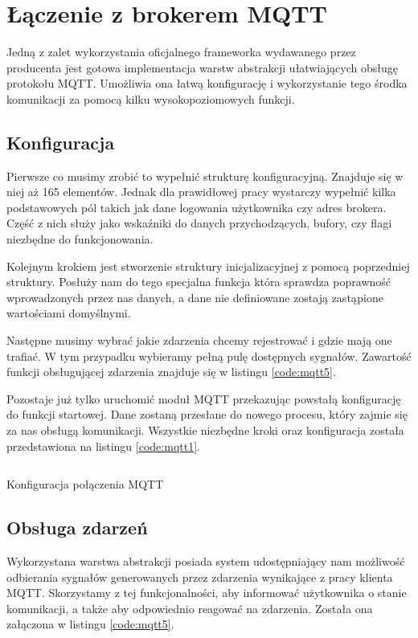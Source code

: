     \section{Łączenie z brokerem MQTT}
        Jedną z zalet wykorzystania oficjalnego frameworka wydawanego przez producenta jest gotowa implementacja warstw abstrakcji ułatwiających obsługę protokołu MQTT. Umożliwia ona łatwą konfigurację i wykorzystanie tego środka komunikacji za pomocą kilku wysokopoziomowych funkcji.
        
        \subsection{Konfiguracja}
        Pierwsze co musimy zrobić to wypełnić strukturę konfiguracyjną. Znajduje się w niej aż 165 elementów. Jednak dla prawidłowej pracy wystarczy wypełnić kilka podstawowych pól takich jak dane logowania użytkownika czy adres brokera. Część z nich służy jako wskaźniki do danych przychodzących, bufory, czy flagi niezbędne do funkcjonowania. 
        
        Kolejnym krokiem jest stworzenie struktury inicjalizacyjnej z pomocą poprzedniej struktury. Posłuży nam do tego specjalna funkcja która sprawdza poprawność wprowadzonych przez nas danych, a dane nie definiowane zostają zastąpione wartościami domyślnymi. 
        
        Następne musimy wybrać jakie zdarzenia chcemy rejestrować i gdzie mają one trafiać. W tym przypadku wybieramy pełną pulę dostępnych sygnałów. Zawartość funkcji obsługującej zdarzenia znajduje się w listingu \ref{code:mqtt5}. 
        
        Pozostaje już tylko uruchomić moduł MQTT przekazując powstałą konfigurację do funkcji startowej. Dane zostaną przesłane do nowego procesu, który zajmie się za nas obsługą komunikacji. Wszystkie niezbędne kroki oraz konfiguracja została przedstawiona na listingu \ref{code:mqtt1}. 
        
        \begin{kod}
            \inputminted[firstline=130]{cpp}{esp/listings/mqtt.cpp}
            \caption{Konfiguracja połączenia MQTT}
            \label{code:mqtt1}
            \vspace{2em}
        \end{kod}
        
        
        
        \subsection{Obsługa zdarzeń}
        Wykorzystana warstwa abstrakcji posiada system udostępniający nam możliwość odbierania sygnałów generowanych przez zdarzenia wynikające z pracy klienta MQTT. Skorzystamy z tej funkcjonalności, aby informować użytkownika o stanie komunikacji, a także aby odpowiednio reagować na zdarzenia. Została ona załączona w listingu \ref{code:mqtt5}.
        
